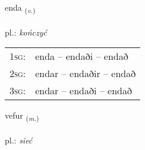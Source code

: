 \documentclass[frontgrid, backgrid]{flacards}\usepackage[]{graphicx}\usepackage[]{xcolor}
\begin{document}
\renewcommand{\flhead}{\vskip5pt \fboxsep=0pt {\small\bfseries\footnotesize Sagnorð | czasownik}}
\renewcommand{\fcfoot}{\vskip5pt \fboxsep=0pt \hspace{2pt}{\small\bfseries\footnotesize 1K}}

\renewcommand{\blhead}{\vskip5pt {\small\bfseries\footnotesize Sagnorð | czasownik }}
\renewcommand{\bcfoot}{\vskip5pt \hspace{2pt}{\small\bfseries\footnotesize 1K}}


{enda \small{\textsubscript{(\textit{v.})}} \\[1ex] %
\textphonetic{[ɛnta]} \\
pl.: \emph{kończyć} \\  [2ex]
\renewcommand*{\arraystretch}{0.8}
\begin{tabular}{p{1cm}l}
\textsc{1sg}: & enda -- endaði -- endað \\ 
\textsc{2sg}: & endar -- endaðir -- endað \\ 
\textsc{3sg}: & endar -- endaði -- endað \\ 
\end{tabular}
}

\renewcommand{\flhead}{\vskip5pt \fboxsep=0pt {\small\bfseries\footnotesize Nafnorð | rzeczownik}}
\renewcommand{\fcfoot}{\vskip5pt \fboxsep=0pt \hspace{2pt}{\small\bfseries\footnotesize 1K}}

\renewcommand{\blhead}{\vskip5pt {\small\bfseries\footnotesize Nafnorð | rzeczownik }}
\renewcommand{\bcfoot}{\vskip5pt \hspace{2pt}{\small\bfseries\footnotesize 1K}}


{vefur \small{\textsubscript{(\textit{m.})}} \\[1ex] %
\textphonetic{[vɛːvʏr]} \\
pl.: \emph{sieć} \\  [2ex]
\renewcommand*{\arraystretch}{0.8}
}
\end{document}
